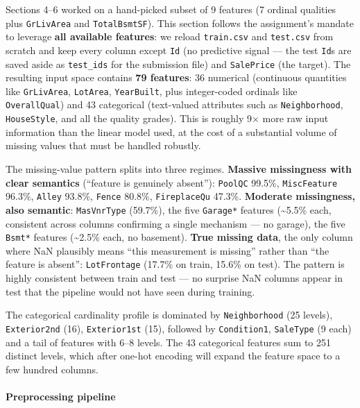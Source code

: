 Sections 4--6 worked on a hand-picked subset of 9 features (7 ordinal
qualities plus \texttt{GrLivArea} and \texttt{TotalBsmtSF}). This
section follows the assignment's mandate to leverage \textbf{all
available features}: we reload \texttt{train.csv} and \texttt{test.csv}
from scratch and keep every column except \texttt{Id} (no predictive
signal --- the test \texttt{Id}s are saved aside as \texttt{test\_ids}
for the submission file) and \texttt{SalePrice} (the target). The
resulting input space contains \textbf{79 features}: 36 numerical
(continuous quantities like \texttt{GrLivArea}, \texttt{LotArea},
\texttt{YearBuilt}, plus integer-coded ordinals like
\texttt{OverallQual}) and 43 categorical (text-valued attributes such as
\texttt{Neighborhood}, \texttt{HouseStyle}, and all the quality grades).
This is roughly 9× more raw input information than the linear model
used, at the cost of a substantial volume of missing values that must be
handled robustly.

The missing-value pattern splits into three regimes. \textbf{Massive
missingness with clear semantics} (``feature is genuinely absent''):
\texttt{PoolQC} 99.5\%, \texttt{MiscFeature} 96.3\%, \texttt{Alley}
93.8\%, \texttt{Fence} 80.8\%, \texttt{FireplaceQu} 47.3\%.
\textbf{Moderate missingness, also semantic}: \texttt{MasVnrType}
(59.7\%), the five \texttt{Garage*} features (\textasciitilde5.5\% each,
consistent across columns confirming a single mechanism --- no garage),
the five \texttt{Bsmt*} features (\textasciitilde2.5\% each, no
basement). \textbf{True missing data}, the only column where NaN
plausibly means ``this measurement is missing'' rather than ``the
feature is absent'': \texttt{LotFrontage} (17.7\% on train, 15.6\% on
test). The pattern is highly consistent between train and test --- no
surprise NaN columns appear in test that the pipeline would not have
seen during training.

The categorical cardinality profile is dominated by
\texttt{Neighborhood} (25 levels), \texttt{Exterior2nd} (16),
\texttt{Exterior1st} (15), followed by \texttt{Condition1},
\texttt{SaleType} (9 each) and a tail of features with 6--8 levels. The
43 categorical features sum to 251 distinct levels, which after one-hot
encoding will expand the feature space to a few hundred columns.

\paragraph{Preprocessing pipeline}\label{preprocessing-pipeline}

